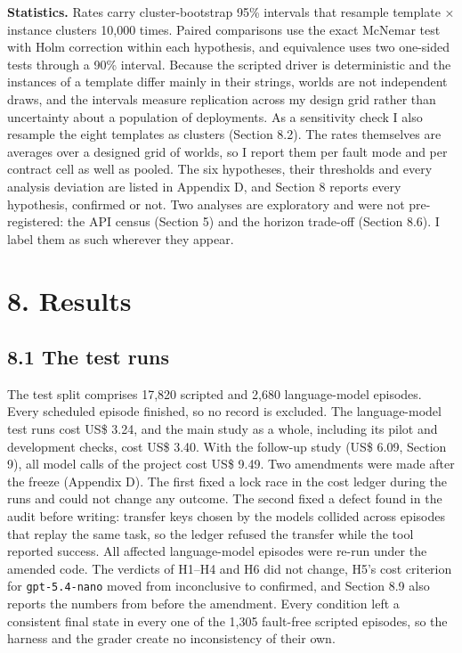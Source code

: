 \documentclass[
  10pt,
]{article}
\begin{document}
\textbf{Statistics.} Rates carry cluster-bootstrap 95\% intervals that
resample template × instance clusters 10,000 times. Paired comparisons
use the exact McNemar test with Holm correction within each hypothesis,
and equivalence uses two one-sided tests through a 90\% interval.
Because the scripted driver is deterministic and the instances of a
template differ mainly in their strings, worlds are not independent
draws, and the intervals measure replication across my design grid
rather than uncertainty about a population of deployments. As a
sensitivity check I also resample the eight templates as clusters
(Section 8.2). The rates themselves are averages over a designed grid of
worlds, so I report them per fault mode and per contract cell as well as
pooled. The six hypotheses, their thresholds and every analysis
deviation are listed in Appendix D, and Section 8 reports every
hypothesis, confirmed or not. Two analyses are exploratory and were not
pre-registered: the API census (Section 5) and the horizon trade-off
(Section 8.6). I label them as such wherever they appear.

\hypertarget{results}{%
\section*{8. Results}\label{results}}

\hypertarget{the-test-runs}{%
\subsection*{8.1 The test runs}\label{the-test-runs}}

The test split comprises 17,820 scripted and 2,680 language-model
episodes. Every scheduled episode finished, so no record is excluded.
The language-model test runs cost US\$ 3.24, and the main study as a
whole, including its pilot and development checks, cost US\$ 3.40. With
the follow-up study (US\$ 6.09, Section 9), all model calls of the
project cost US\$ 9.49. Two amendments were made after the freeze
(Appendix D). The first fixed a lock race in the cost ledger during the
runs and could not change any outcome. The second fixed a defect found
in the audit before writing: transfer keys chosen by the models collided
across episodes that replay the same task, so the ledger refused the
transfer while the tool reported success. All affected language-model
episodes were re-run under the amended code. The verdicts of H1--H4 and
H6 did not change, H5's cost criterion for \texttt{gpt-5.4-nano} moved
from inconclusive to confirmed, and Section 8.9 also reports the numbers
from before the amendment. Every condition left a consistent final state
in every one of the 1,305 fault-free scripted episodes, so the harness
and the grader create no inconsistency of their own.
\end{document}
